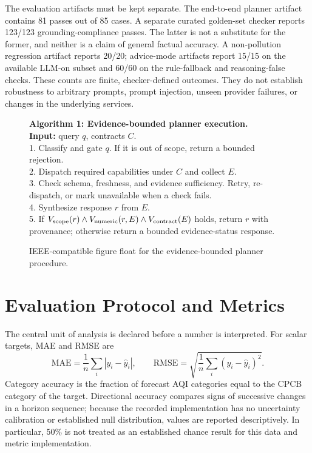 \documentclass[conference]{IEEEtran}
\begin{document}
The evaluation artifacts must be kept separate. The end-to-end planner artifact contains 81 passes out of 85 cases. A separate curated golden-set checker reports 123/123 grounding-compliance passes. The latter is not a substitute for the former, and neither is a claim of general factual accuracy. A non-pollution regression artifact reports 20/20; advice-mode artifacts report 15/15 on the available LLM-on subset and 60/60 on the rule-fallback and reasoning-false checks. These counts are finite, checker-defined outcomes. They do not establish robustness to arbitrary prompts, prompt injection, unseen provider failures, or changes in the underlying services.

\begin{figure}[t]
\centering
\begin{minipage}{0.95\columnwidth}
\footnotesize
\textbf{Algorithm 1: Evidence-bounded planner execution.}\\
\textbf{Input:} query $q$, contracts $C$.\\
1. Classify and gate $q$. If it is out of scope, return a bounded rejection.\\
2. Dispatch required capabilities under $C$ and collect $E$.\\
3. Check schema, freshness, and evidence sufficiency. Retry, re-dispatch, or mark unavailable when a check fails.\\
4. Synthesize response $r$ from $E$.\\
5. If $V_{\rm scope}(r)\land V_{\rm numeric}(r,E)\land V_{\rm contract}(E)$ holds, return $r$ with provenance; otherwise return a bounded evidence-status response.
\end{minipage}
\caption{IEEE-compatible figure float for the evidence-bounded planner procedure.}
\label{fig:algorithm}
\end{figure}

\section{Evaluation Protocol and Metrics}
\label{sec:metrics}
The central unit of analysis is declared before a number is interpreted. For scalar targets, MAE and RMSE are
\begin{equation}
 \mathrm{MAE}=\frac{1}{n}\sum_i|y_i-\hat y_i|,\qquad
 \mathrm{RMSE}=\sqrt{\frac{1}{n}\sum_i(y_i-\hat y_i)^2}.
\end{equation}
Category accuracy is the fraction of forecast AQI categories equal to the CPCB category of the target. Directional accuracy compares signs of successive changes in a horizon sequence; because the recorded implementation has no uncertainty calibration or established null distribution, values are reported descriptively. In particular, 50\% is not treated as an established chance result for this data and metric implementation.
\end{document}
